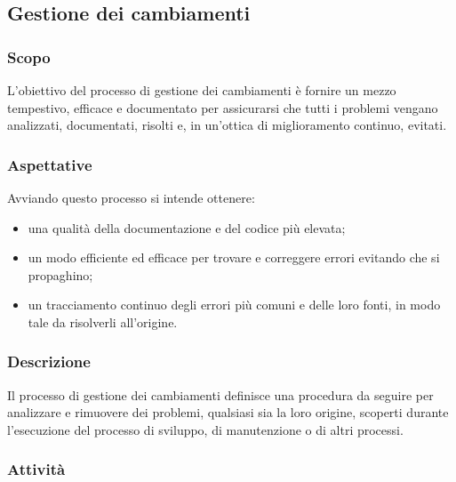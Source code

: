 \subsection{Gestione dei cambiamenti}

	\subsubsection{Scopo}
		L'obiettivo del processo di gestione dei cambiamenti è fornire un mezzo tempestivo, efficace e documentato per assicurarsi che tutti i problemi vengano analizzati, documentati, risolti e, in un'ottica di miglioramento continuo, evitati.

	\subsubsection{Aspettative}
		Avviando questo processo si intende ottenere:
		\begin{itemize}
		 	\item una qualità della documentazione e del codice più elevata;
		 	\item un modo efficiente ed efficace per trovare e correggere errori evitando che si propaghino;
		 	\item un tracciamento continuo degli errori più comuni e delle loro fonti, in modo tale da risolverli all'origine.
		 \end{itemize}
	\subsubsection{Descrizione}
		Il processo di gestione dei cambiamenti definisce una procedura da seguire per analizzare e rimuovere dei problemi, qualsiasi sia la loro origine, scoperti durante l'esecuzione del processo di sviluppo, di manutenzione o di altri processi.

	\subsubsection{Attività}
